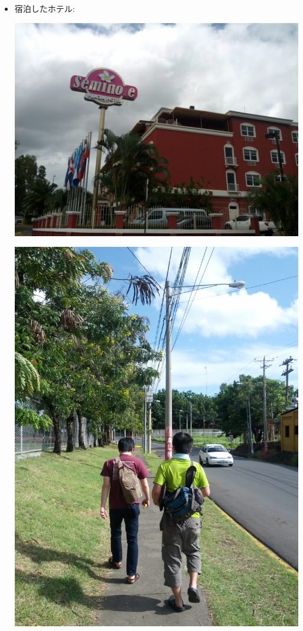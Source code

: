 \documentclass[mingoth,a4paper]{jsarticle}
\begin{document}
\begin{itemize}
 \item 宿泊したホテル:\\
	\begin{minipage}{0.4\hsize}
	\includegraphics[width=0.8\hsize]{image201208/debconf12_hotel.jpg}
	\end{minipage}
        \begin{minipage}{0.4\hsize}
        \includegraphics[width=0.8\hsize]{image201208/debconf12_hotel2.jpg}
        \end{minipage}

\end{itemize} 
\end{document}
